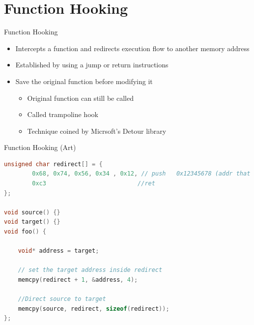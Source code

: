 \section{Function Hooking}
\begin{frame}{Function Hooking}
    \begin{itemize}
    \item Intercepts a function and redirects execution flow to another memory address
    \item Established by using a jump or return instructions
    \item Save the original function before modifying it
    \begin{itemize}
    	\item Original function can still be called
    	\item Called trampoline hook
    	\item Technique coined by Micrsoft's Detour library \cite{detours-binary-interception-of-win32-functions}
    \end{itemize}
    \end{itemize}
\end{frame}

%    

\begin{frame}[fragile]{Function Hooking (Art)}
    \begin{lstlisting}[language=C++, style=CppCodeStyle, caption=Redirection to another address]
unsigned char redirect[] = {
        0x68, 0x74, 0x56, 0x34 , 0x12, // push   0x12345678 (addr that contains target address)
        0xc3						  //ret	   
};

void source() {}
void target() {}
void foo() {

	void* address = target;	
	
	// set the target address inside redirect
	memcpy(redirect + 1, &address, 4);
	
	//Direct source to target
	memcpy(source, redirect, sizeof(redirect)); 
};
	\end{lstlisting}
\end{frame}

